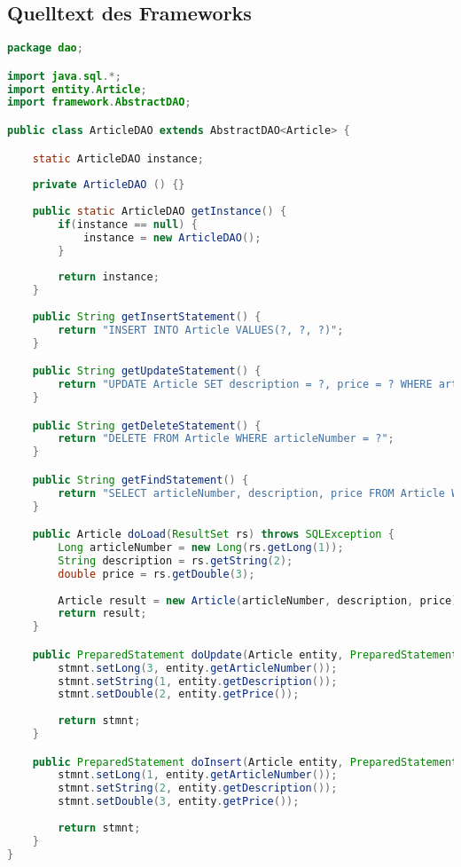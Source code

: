 \subsection{Quelltext des Frameworks}
\begin{lstlisting}[language=java, style=java, caption={ArticleDAO.java},
label={lst:lst1}]
package dao;

import java.sql.*;
import entity.Article;
import framework.AbstractDAO;

public class ArticleDAO extends AbstractDAO<Article> {

	static ArticleDAO instance;
	
	private ArticleDAO () {}
	
	public static ArticleDAO getInstance() {
		if(instance == null) {
			instance = new ArticleDAO();
		}
		
		return instance;
	}
	
	public String getInsertStatement() {
		return "INSERT INTO Article VALUES(?, ?, ?)";
	}

	public String getUpdateStatement() {
		return "UPDATE Article SET description = ?, price = ? WHERE articleNumber = ?";
	}

	public String getDeleteStatement() {
		return "DELETE FROM Article WHERE articleNumber = ?";
	}

	public String getFindStatement() {
		return "SELECT articleNumber, description, price FROM Article WHERE articleNumber=?";
	}

	public Article doLoad(ResultSet rs) throws SQLException {
		Long articleNumber = new Long(rs.getLong(1));
		String description = rs.getString(2);
		double price = rs.getDouble(3);
		
		Article result = new Article(articleNumber, description, price);
		return result;
	}

	public PreparedStatement doUpdate(Article entity, PreparedStatement stmnt) throws SQLException {
        stmnt.setLong(3, entity.getArticleNumber());
        stmnt.setString(1, entity.getDescription());
        stmnt.setDouble(2, entity.getPrice());
        
		return stmnt;
	}

	public PreparedStatement doInsert(Article entity, PreparedStatement stmnt) throws SQLException {
        stmnt.setLong(1, entity.getArticleNumber());
        stmnt.setString(2, entity.getDescription());
        stmnt.setDouble(3, entity.getPrice());
        
		return stmnt;
	}
}
\end{lstlisting}



